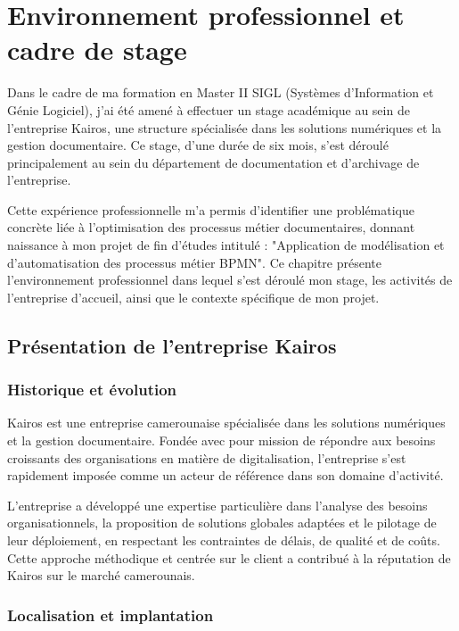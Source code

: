 
\chapter{Environnement professionnel et cadre de stage}
\label{ch:environnement_stage}

Dans le cadre de ma formation en Master II SIGL (Systèmes d'Information et Génie Logiciel), j'ai été amené à effectuer un stage académique au sein de l'entreprise Kairos, une structure spécialisée dans les solutions numériques et la gestion documentaire. Ce stage, d'une durée de six mois, s'est déroulé principalement au sein du département de documentation et d'archivage de l'entreprise.

Cette expérience professionnelle m'a permis d'identifier une problématique concrète liée à l'optimisation des processus métier documentaires, donnant naissance à mon projet de fin d'études intitulé : "Application de modélisation et d'automatisation des processus métier BPMN". Ce chapitre présente l'environnement professionnel dans lequel s'est déroulé mon stage, les activités de l'entreprise d'accueil, ainsi que le contexte spécifique de mon projet.

\section{Présentation de l'entreprise Kairos}

    \subsection{Historique et évolution}
    
    Kairos est une entreprise camerounaise spécialisée dans les solutions numériques et la gestion documentaire. Fondée avec pour mission de répondre aux besoins croissants des organisations en matière de digitalisation, l'entreprise s'est rapidement imposée comme un acteur de référence dans son domaine d'activité.
    
    L'entreprise a développé une expertise particulière dans l'analyse des besoins organisationnels, la proposition de solutions globales adaptées et le pilotage de leur déploiement, en respectant les contraintes de délais, de qualité et de coûts. Cette approche méthodique et centrée sur le client a contribué à la réputation de Kairos sur le marché camerounais.
    
    \subsection{Localisation et implantation}
    
